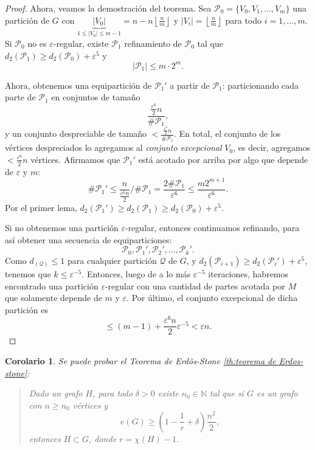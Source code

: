 \documentclass[12pt]{report}
\theoremstyle{plain}
\newtheorem{corollary}[theorem]{Corolario}
\theoremstyle{definition}
\newcommand{\naturals}{\mathbb{N}}
\newcommand{\abs}[1]{\left \vert #1 \right \vert}
\newcommand{\floor}[1]{\left\lfloor #1  \right\rfloor}
\begin{document}
\begin{proof}
Ahora, veamos la demostración del teorema. Sea $\mathcal P_0 = \{V_0, V_1, \ldots, V_m\}$ una partición de $G$ con $\underbrace{\abs {V_0}}_{1 \leq \abs{V_0} \leq m-1} = n - n \floor{\frac n m}$ y $\abs{V_i} = \floor{\frac{n}{m}}$ para todo $i = 1 , \ldots, m$. Si $\mathcal P_0$ no es $\varepsilon$-regular, existe $\mathcal P_1$ refinamiento de $\mathcal P_0$ tal que $d_2 (\mathcal P_1) \geq d_2 (\mathcal P_0) + \varepsilon^5$ y
\[
\abs{\mathcal P_1} \leq m \cdot 2^m.
\]

Ahora, obtenemos una equipartición de $\mathcal P_1'$ a partir de $\mathcal P_1$: particionando cada parte de $\mathcal P_1$ en conjuntos de tamaño
\[
\frac{\frac{\varepsilon^6}{2}n}{\# \mathcal P _1},
\]
y un conjunto despreciable de tamaño $< \frac{\frac{\varepsilon^6}{2}n}{\# \mathcal P _1}$. En total, el conjunto de los vértices despreciados lo agregamos al \textit{conjunto excepcional} $V_0$, es decir, agregamos $< \frac{\varepsilon^6}{2}n$ vértices. Afirmamos que $\mathcal P_1'$ está acotado por arriba por algo que depende de $\varepsilon$ y $m$:
\[
\# \mathcal P _ 1 ' \leq \frac{n}{\frac{\varepsilon^6 n}{2}}\big / \# \mathcal P_1 = \frac{2 \# \mathcal P _1}{\varepsilon^6} \leq \frac{m2^{m+1}}{\varepsilon^6}.
\]
Por el primer lema, $d_2 (\mathcal P_1 ') \geq d_2 (\mathcal P_1) \geq d_2 (\mathcal P_0) + \varepsilon^5$.

Si no obtenemos una partición $\varepsilon$-regular, entonces continuamos refinando, para así obtener una secuencia de equiparticiones:
\[
\mathcal P_0, \mathcal P _1 ' , \mathcal P_2 ' , \ldots, \mathcal P _k'.
\]
Como $d_(\mathcal Q) \leq 1$ para cualquier partición $\mathcal Q$ de $G$, y $d_2 (\mathcal P_{i+1}) \geq d_2 (\mathcal P_i') + \varepsilon^5$, tenemos que $k \leq \varepsilon^{-5}$.
Entonces, luego de a lo más $\varepsilon^{-5}$ iteraciones, habremos encontrado una partición $\varepsilon$-regular con una cantidad de partes acotada por $M$ que solamente depende de $m $ y $\varepsilon$. Por último, el conjunto excepcional de dicha partición es
\[
\leq (m-1) + \frac{\varepsilon^6 n}{2} \varepsilon^{-5} < \varepsilon n.
\]


\end{proof}

\begin{corollary}
Se puede probar el Teorema de Erdös-Stone \ref{th:teorema de Erdos-stone}:
\begin{quote}
Dado un grafo $H$, para todo $\delta >0$ existe $n_0 \in \naturals$ tal que si $G$ es un grafo con $n \geq n_0$ vértices y
\[
    e(G) \geq \left ( 1 - \frac 1 r + \delta \right ) \frac{n^2}{2},
\]
entonces $H \subset G$, donde $r = \chi (H) - 1$.
\end{quote}
\end{corollary}
\end{document}
